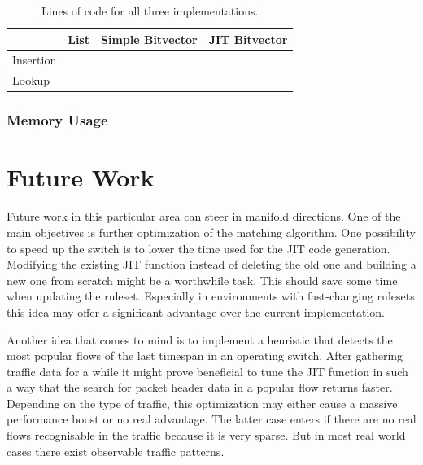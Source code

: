 \documentclass[a4paper,
		12pt,
		parskip=full,
		titlepage
		]{scrartcl}
\begin{document}
\begin{table}
  \centering
  \begin{tabularx}{\textwidth}{l|XXX}
  &List&Simple Bitvector&JIT Bitvector\\
  \hline
  Insertion&&&\\
  Lookup&&&\\
  \end{tabularx}
  \caption{Lines of code for all three implementations.}
  \label{table:loc}
\end{table}

\subsubsection{Memory Usage}

\section{Future Work}
Future work in this particular area can steer in manifold directions.
One of the main objectives is further optimization of the matching algorithm.
One possibility to speed up the switch is to lower the time used for the JIT code generation.
Modifying the existing JIT function instead of deleting the old one and building 
a new one from scratch might be a worthwhile task.
This should save some time when updating the ruleset.
Especially in environments with fast-changing rulesets this idea may offer 
a significant advantage over the current implementation.

Another idea that comes to mind is to implement a heuristic that detects 
the most popular flows of the last timespan in an operating switch.
After gathering traffic data for a while it might prove beneficial to tune 
the JIT function in such a way that the search for packet header data in a popular flow returns faster.
Depending on the type of traffic, this optimization may either cause a massive performance boost or no real advantage.
The latter case enters if there are no real flows recognisable in the traffic because it is very sparse.
But in most real world cases there exist observable traffic patterns.

\newpage
{}


\end{document}
